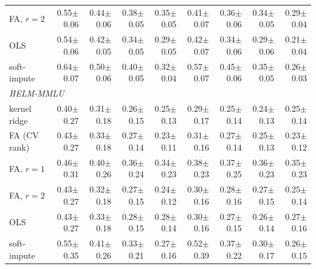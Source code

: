 \begin{tabular}{lrrrrrrrr}
FA, $r=2$ & 0.55{\tiny$\pm$0.06} & 0.44{\tiny$\pm$0.06} & 0.38{\tiny$\pm$0.05} & 0.35{\tiny$\pm$0.05} & 0.41{\tiny$\pm$0.07} & 0.36{\tiny$\pm$0.06} & 0.34{\tiny$\pm$0.05} & 0.29{\tiny$\pm$0.04} \\
OLS & 0.54{\tiny$\pm$0.06} & 0.42{\tiny$\pm$0.05} & 0.34{\tiny$\pm$0.05} & 0.29{\tiny$\pm$0.05} & 0.42{\tiny$\pm$0.07} & 0.34{\tiny$\pm$0.06} & 0.29{\tiny$\pm$0.06} & 0.21{\tiny$\pm$0.04} \\
soft-impute & 0.64{\tiny$\pm$0.07} & 0.50{\tiny$\pm$0.06} & 0.40{\tiny$\pm$0.05} & 0.32{\tiny$\pm$0.04} & 0.57{\tiny$\pm$0.07} & 0.45{\tiny$\pm$0.06} & 0.35{\tiny$\pm$0.05} & 0.26{\tiny$\pm$0.03} \\
\midrule
\multicolumn{9}{l}{\emph{HELM-MMLU}} \\
kernel ridge & 0.40{\tiny$\pm$0.27} & 0.31{\tiny$\pm$0.18} & 0.26{\tiny$\pm$0.15} & 0.25{\tiny$\pm$0.13} & 0.29{\tiny$\pm$0.17} & 0.25{\tiny$\pm$0.14} & 0.24{\tiny$\pm$0.13} & 0.25{\tiny$\pm$0.14} \\
FA (CV rank) & 0.43{\tiny$\pm$0.27} & 0.33{\tiny$\pm$0.18} & 0.27{\tiny$\pm$0.14} & 0.23{\tiny$\pm$0.11} & 0.31{\tiny$\pm$0.16} & 0.27{\tiny$\pm$0.14} & 0.25{\tiny$\pm$0.13} & 0.23{\tiny$\pm$0.12} \\
FA, $r=1$ & 0.46{\tiny$\pm$0.31} & 0.40{\tiny$\pm$0.26} & 0.36{\tiny$\pm$0.24} & 0.34{\tiny$\pm$0.23} & 0.38{\tiny$\pm$0.23} & 0.37{\tiny$\pm$0.25} & 0.36{\tiny$\pm$0.23} & 0.35{\tiny$\pm$0.23} \\
FA, $r=2$ & 0.43{\tiny$\pm$0.27} & 0.32{\tiny$\pm$0.18} & 0.27{\tiny$\pm$0.15} & 0.24{\tiny$\pm$0.12} & 0.30{\tiny$\pm$0.16} & 0.28{\tiny$\pm$0.16} & 0.27{\tiny$\pm$0.15} & 0.25{\tiny$\pm$0.14} \\
OLS & 0.43{\tiny$\pm$0.27} & 0.33{\tiny$\pm$0.18} & 0.28{\tiny$\pm$0.15} & 0.28{\tiny$\pm$0.14} & 0.30{\tiny$\pm$0.16} & 0.27{\tiny$\pm$0.15} & 0.26{\tiny$\pm$0.14} & 0.27{\tiny$\pm$0.16} \\
soft-impute & 0.55{\tiny$\pm$0.35} & 0.41{\tiny$\pm$0.26} & 0.33{\tiny$\pm$0.21} & 0.27{\tiny$\pm$0.16} & 0.52{\tiny$\pm$0.39} & 0.37{\tiny$\pm$0.22} & 0.30{\tiny$\pm$0.17} & 0.26{\tiny$\pm$0.15} \\
\bottomrule
\end{tabular}
